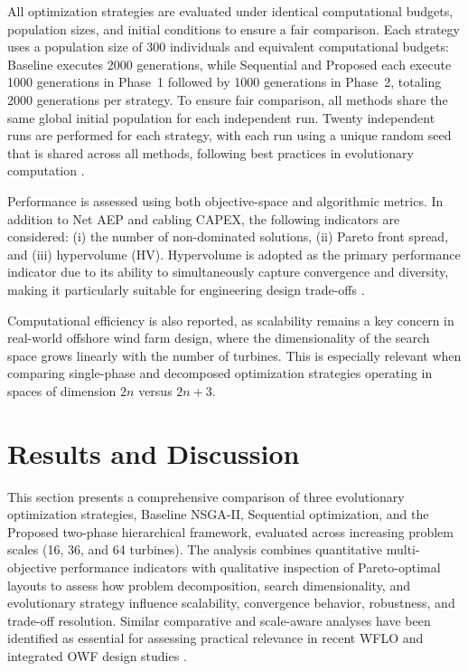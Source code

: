 \documentclass[format=sigconf,anonymous=true,review=true]{acmart}
\begin{document}
All optimization strategies are evaluated under identical computational budgets, population sizes, and initial conditions to ensure a fair comparison. Each strategy uses a population size of 300 individuals and equivalent computational budgets: Baseline executes 2000 generations, while Sequential and Proposed each execute 1000 generations in Phase~1 followed by 1000 generations in Phase~2, totaling 2000 generations per strategy. To ensure fair comparison, all methods share the same global initial population for each independent run. Twenty independent runs are performed for each strategy, with each run using a unique random seed that is shared across all methods, following best practices in evolutionary computation \cite{Deb2002NSGA2, Haupt2004}.

Performance is assessed using both objective-space and algorithmic metrics. In addition to Net AEP and cabling CAPEX, the following indicators are considered: (i) the number of non-dominated solutions, (ii) Pareto front spread, and (iii) hypervolume (HV). Hypervolume is adopted as the primary performance indicator due to its ability to simultaneously capture convergence and diversity, making it particularly suitable for engineering design trade-offs \cite{Deb2002NSGA2}.

Computational efficiency is also reported, as scalability remains a key concern in real-world offshore wind farm design, where the dimensionality of the search space grows linearly with the number of turbines. This is especially relevant when comparing single-phase and decomposed optimization strategies operating in spaces of dimension $2n$ versus $2n+3$.

\section{Results and Discussion}
\label{sec:results}

This section presents a comprehensive comparison of three evolutionary optimization strategies, Baseline NSGA-II, Sequential optimization, and the Proposed two-phase hierarchical framework, evaluated across increasing problem scales (16, 36, and 64 turbines). The analysis combines quantitative multi-objective performance indicators with qualitative inspection of Pareto-optimal layouts to assess how problem decomposition, search dimensionality, and evolutionary strategy influence scalability, convergence behavior, robustness, and trade-off resolution. Similar comparative and scale-aware analyses have been identified as essential for assessing practical relevance in recent WFLO and integrated OWF design studies \cite{Jiang2025Review, Tao2025TwoStage}.
\end{document}
